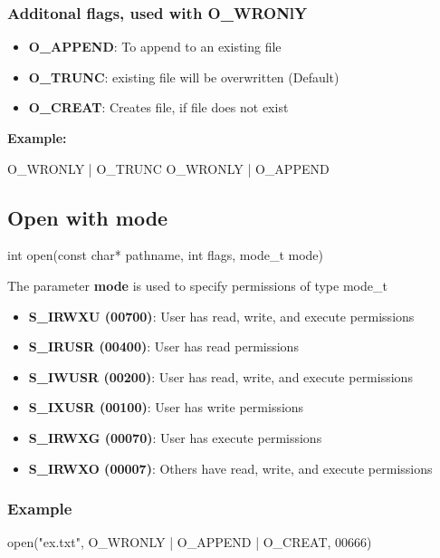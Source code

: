\documentclass{report}
\begin{document}
    \subsubsection{Additonal flags, used with O\_WRONlY}
    \begin{itemize}
        \item \textbf{O\_APPEND}: To append to an existing file
        \item \textbf{O\_TRUNC}: existing file will be overwritten (Default)
        \item \textbf{O\_CREAT}: Creates file, if file does not exist
    \end{itemize}
    \bigbreak \noindent 
    \textbf{Example:}
    \bigbreak \noindent 
    \begin{cppcode}
    O_WRONLY | O_TRUNC 
    O_WRONLY | O_APPEND 
    \end{cppcode}

    \bigbreak \noindent 
    \subsection{Open with mode}
    \bigbreak \noindent 
    \begin{cppcode}
    int open(const char* pathname, int flags, mode_t mode)
    \end{cppcode}
    \bigbreak \noindent 
    The parameter \textbf{mode} is used to specify permissions of type mode\_t
    \begin{itemize}
        \item \textbf{S\_IRWXU (00700)}: User has read, write, and execute permissions
        \item \textbf{S\_IRUSR (00400)}: User has read permissions
        \item \textbf{S\_IWUSR (00200)}: User has read, write, and execute permissions
        \item \textbf{S\_IXUSR (00100)}: User has write permissions
        \item \textbf{S\_IRWXG (00070)}: User has execute permissions
        \item \textbf{S\_IRWXO (00007)}: Others have read, write, and execute permissions
    \end{itemize}

    \bigbreak \noindent 
    \subsubsection{Example}
    \bigbreak \noindent 
    \begin{cppcode}
    open("ex.txt", O_WRONLY | O_APPEND | O_CREAT, 00666)
    \end{cppcode}
\end{document}
